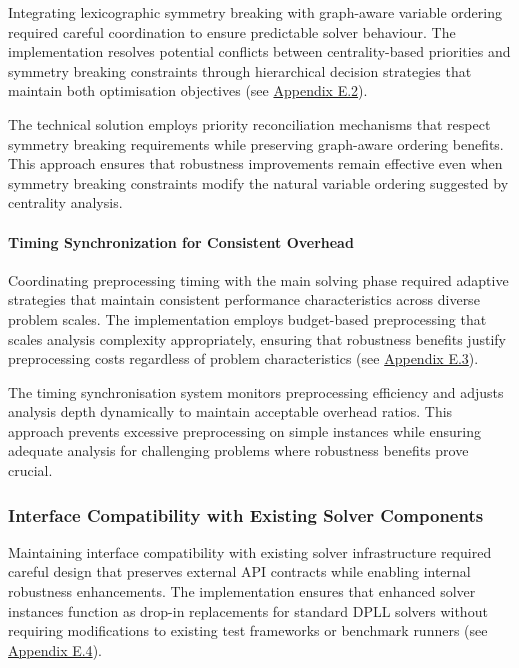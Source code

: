 Integrating lexicographic symmetry breaking with graph-aware variable ordering required careful coordination to ensure predictable solver behaviour. The implementation resolves potential conflicts between centrality-based priorities and symmetry breaking constraints through hierarchical decision strategies that maintain both optimisation objectives (see \hyperref[appendix:symmetry-integration]{Appendix E.2}).

The technical solution employs priority reconciliation mechanisms that respect symmetry breaking requirements while preserving graph-aware ordering benefits. This approach ensures that robustness improvements remain effective even when symmetry breaking constraints modify the natural variable ordering suggested by centrality analysis.

\paragraph{Timing Synchronization for Consistent Overhead}

Coordinating preprocessing timing with the main solving phase required adaptive strategies that maintain consistent performance characteristics across diverse problem scales. The implementation employs budget-based preprocessing that scales analysis complexity appropriately, ensuring that robustness benefits justify preprocessing costs regardless of problem characteristics (see \hyperref[appendix:timing-coordination]{Appendix E.3}).

The timing synchronisation system monitors preprocessing efficiency and adjusts analysis depth dynamically to maintain acceptable overhead ratios. This approach prevents excessive preprocessing on simple instances while ensuring adequate analysis for challenging problems where robustness benefits prove crucial.

\subsubsection{Interface Compatibility with Existing Solver Components}

Maintaining interface compatibility with existing solver infrastructure required careful design that preserves external API contracts while enabling internal robustness enhancements. The implementation ensures that enhanced solver instances function as drop-in replacements for standard DPLL solvers without requiring modifications to existing test frameworks or benchmark runners (see \hyperref[appendix:interface-compatibility]{Appendix E.4}).

